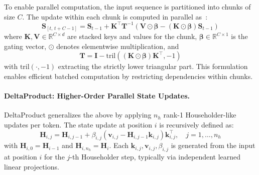 \documentclass[10pt,a4paper]{article}
\begin{document}
To enable parallel computation, the input sequence is partitioned into chunks of size $C$. The update within each chunk is computed in parallel as~\cite{yang2024parallelizing}:
\begin{equation}
    \mathbf{S}_{[t,\,t+C-1]} = \mathbf{S}_{t-1} + \mathbf{K}^\top
    \mathbf{T}^{-1}
    \left( \mathbf{V} \odot \boldsymbol{\beta} - (\mathbf{K} \odot \boldsymbol{\beta}) \mathbf{S}_{t-1} \right)
    \label{eq:chunk-deltanet}
\end{equation}
where $\mathbf{K}, \mathbf{V} \in \mathbb{R}^{C \times d}$ are stacked keys and values for the chunk, $\boldsymbol{\beta} \in \mathbb{R}^{C \times 1}$ is the gating vector, $\odot$ denotes elementwise multiplication, and
\begin{equation}
    \mathbf{T} = \mathbf{I} - \mathrm{tril}\left((\mathbf{K} \odot \boldsymbol{\beta}) \mathbf{K}^\top, -1\right)
    \label{eq:triangular}
\end{equation}
with $\mathrm{tril}(\cdot, -1)$ extracting the strictly lower triangular part. This formulation enables efficient batched computation by restricting dependencies within chunks.


\paragraph{DeltaProduct: Higher-Order Parallel State Updates.}

DeltaProduct generalizes the above by applying $n_h$ rank-1 Householder-like updates per token. The state update at position $i$ is recursively defined as:
\begin{equation}
    \mathbf{H}_{i, j} = \mathbf{H}_{i, j-1} + \beta_{i, j} \left( \mathbf{v}_{i, j} - \mathbf{H}_{i, j-1} \mathbf{k}_{i, j} \right) \mathbf{k}_{i, j}^\top, \quad j=1,\ldots,n_h
    \label{eq:deltaproduct-recurrence}
\end{equation}
with $\mathbf{H}_{i, 0} = \mathbf{H}_{i-1}$ and $\mathbf{H}_{i, n_h} = \mathbf{H}_i$. Each $\mathbf{k}_{i, j}, \mathbf{v}_{i, j}, \beta_{i, j}$ is generated from the input at position $i$ for the $j$-th Householder step, typically via independent learned linear projections.

\end{document}
